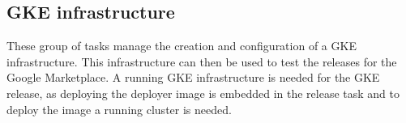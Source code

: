 \subsection{GKE infrastructure}\label{subsec:gke-infrastructure}


These group of tasks manage the creation and configuration of a GKE infrastructure.
This infrastructure can then be used to test the releases for the Google Marketplace.
A running GKE infrastructure is needed for the GKE release, as deploying the deployer image is embedded in the release task and to deploy the image a running cluster is needed.

\pagebreak





\pagebreak

